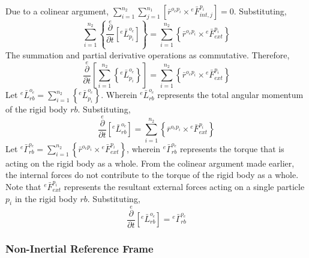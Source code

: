 \documentclass[a4paper, 12pt]{report}
\begin{document}
\begin{center}
Due to a colinear argument, $\displaystyle \sum^{n_{2}}_{i = 1}  \sum^{n_{1}}_{j = 1}\left[\bar{r}^{o_{e}p_{i}}\times{}^{e}\bar{F}^{p_{i}}_{int,j}\right] = 0$. Substituting,
$$\sum^{n_{2}}_{i = 1}\left\{ \overset{e}{\frac{\partial}{\partial t}}\left[{}^{e}\bar{L}^{o_{e}}_{p_{i}}\right]\right\} = \sum^{n_{2}}_{i = 1}\left\{ \bar{r}^{o_{e}p_{i}}\times{}^{e}\bar{F}^{p_{i}}_{ext}\right\}$$
The summation and partial derivative operations as commutative. Therefore,
$$\overset{e}{\frac{\partial}{\partial t}}\left[\sum^{n_{2}}_{i = 1}\left\{{}^{e}\bar{L}^{o_{e}}_{p_{i}}\right\}\right] = \sum^{n_{2}}_{i = 1}\left\{ \bar{r}^{o_{e}p_{i}}\times{}^{e}\bar{F}^{p_{i}}_{ext}\right\}$$
Let $\displaystyle {}^{e}\bar{L}^{o_{e}}_{rb} = \sum^{n_{2}}_{i = 1}\left\{{}^{e}\bar{L}^{o_{e}}_{p_{i}}\right\}$. Wherein $\displaystyle {}^{e}\bar{L}^{o_{e}}_{rb}$ represents the total angular momentum of the rigid body $rb$. Substituting,
$$\overset{e}{\frac{\partial}{\partial t}}\left[{}^{e}\bar{L}^{o_{e}}_{rb}\right] = \sum^{n_{2}}_{i = 1}\left\{ \bar{r}^{o_{e}p_{i}}\times{}^{e}\bar{F}^{p_{i}}_{ext}\right\}$$
Let $\displaystyle {}^{e}\bar{\Gamma}^{o_{e}}_{rb} = \sum^{n_{2}}_{i = 1}\left\{ \bar{r}^{o_{e}p_{i}}\times{}^{e}\bar{F}^{p_{i}}_{ext}\right\}\label{euler-law-primitive}$, wherein ${}^{e}\bar{\Gamma}^{o_{e}}_{rb}$ represents the torque that is acting on the rigid body as a whole. From the colinear argument made earlier, the internal forces do not contribute to the torque of the rigid body as a whole. Note that ${}^{e}\bar{F}^{p_{i}}_{ext}$ represents the resultant external forces acting on a single particle $p_{i}$ in the rigid body $rb$. Substituting,
$$\overset{e}{\frac{\partial}{\partial t}}\left[{}^{e}\bar{L}^{o_{e}}_{rb}\right] = {}^{e}\bar{\Gamma}^{o_{e}}_{rb}$$

\subsubsection{Non-Inertial Reference Frame}
\begin{comment}
\end{comment}




\end{center}
\end{document}
